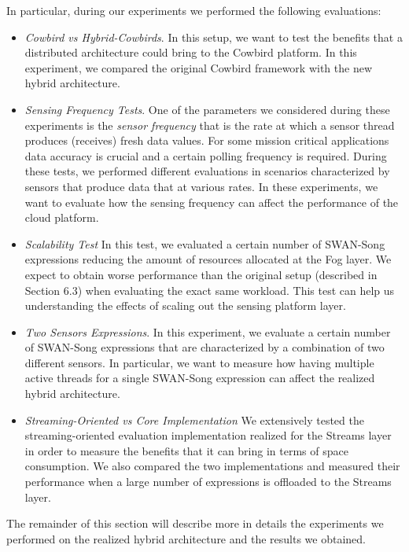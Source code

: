 In particular, during our experiments we performed the following evaluations:
\begin{itemize}
\item \emph{Cowbird vs Hybrid-Cowbirds}. In this setup, we want to test the benefits that a distributed architecture could bring to the Cowbird platform. In this experiment, we compared the original Cowbird framework with the new hybrid architecture.

\item \emph{Sensing Frequency Tests}. One of the parameters we considered during these experiments is the \emph{sensor frequency} that is the rate at which a sensor thread produces (receives) fresh data values. For some mission critical applications data accuracy is crucial and a certain polling frequency is required. During these tests, we performed different evaluations in scenarios characterized by sensors that produce data that at various rates. In these experiments, we want to evaluate how the sensing frequency can affect the performance of the cloud platform.
\item \emph{Scalability Test} In this test, we evaluated a certain number of SWAN-Song expressions reducing the amount of resources allocated at the Fog layer. We expect to obtain worse performance than the original setup (described in Section 6.3) when evaluating the exact same workload. This test can help us understanding the effects of scaling out the sensing platform layer.
\item \emph{Two Sensors Expressions}. In this experiment, we evaluate a certain number of SWAN-Song expressions that are characterized by a combination of two different sensors. In particular, we want to measure how having multiple active threads for a single SWAN-Song expression can affect the realized hybrid architecture.
\item \emph{Streaming-Oriented vs Core Implementation} We extensively tested the streaming-oriented evaluation implementation realized for the Streams layer in order to measure the benefits that it can bring in terms of space consumption. We also compared the two implementations and measured their performance when a large number of expressions is offloaded to the Streams layer.
\end{itemize}

The remainder of this section will describe more in details the experiments we performed on the realized hybrid architecture and the results we obtained.


